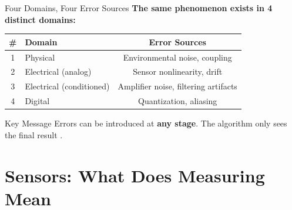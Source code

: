 \documentclass[aspectratio=169,11pt]{beamer}
\begin{document}
\begin{frame}{Four Domains, Four Error Sources}
    \textbf{The same phenomenon exists in 4 distinct domains:}
    
    \vspace{0.5cm}
    \begin{table}
        \centering
        \begin{tabular}{clc}
            \toprule
            \textbf{\#} & \textbf{Domain} & \textbf{Error Sources} \\
            \midrule
            1 & Physical & Environmental noise, coupling \\
            2 & Electrical (analog) & Sensor nonlinearity, drift \\
            3 & Electrical (conditioned) & Amplifier noise, filtering artifacts \\
            4 & Digital & Quantization, aliasing \\
            \bottomrule
        \end{tabular}
    \end{table}
    
    \vspace{0.3cm}
    \begin{block}{Key Message}
        Errors can be introduced at \textbf{any stage}. The algorithm only sees the final result \cite{pallasareny2012sensors}.
    \end{block}
\end{frame}

\section{Sensors: What Does Measuring Mean}
\end{document}
